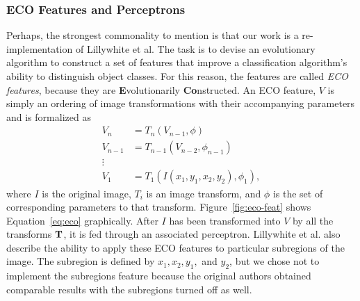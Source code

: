 \documentclass[conference]{IEEEtran}
\begin{document}
\subsubsection{ECO Features and Perceptrons}
Perhaps, the strongest commonality to mention is that our work is a re-implementation of Lillywhite et al. The task is to devise an evolutionary algorithm to construct a set of features that improve a classification algorithm's ability to distinguish object classes. For this reason, the features are called {\it ECO features}, because they are {\bf E}volutionarily {\bf Co}nstructed. An ECO feature, $V$ is simply an ordering of image transformations with their accompanying parameters and is formalized as
\begin{equation}
  \begin{split}
    V_n & = T_n(V_{n-1}, \phi)\\
    V_{n-1} & = T_{n-1}(V_{n-2},\phi_{n-1})\\
    \vdots\\
    V_1 & = T_1(I(x_1,y_1,x_2,y_2), \phi_{1}),
  \end{split}
  \label{eq:eco}
\end{equation}
where $I$ is the original image, $T_i$ is an image transform, and $\phi$ is the set of corresponding parameters to that transform. Figure~\ref{fig:eco-feat} shows Equation~\ref{eq:eco} graphically. After $I$ has been transformed into $V$ by all the transforms ${\bf T}$, it is fed through an associated perceptron. Lillywhite et al. also describe the ability to apply these ECO features to particular subregions of the image. The subregion is defined by $x_1, x_2, y_1,$ and $y_2$, but we chose not to implement the subregions feature because the original authors obtained comparable results with the subregions turned off as well.
\end{document}
